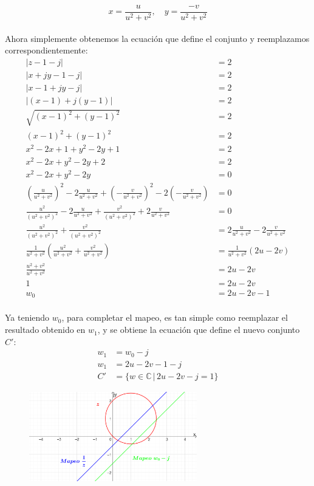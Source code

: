 \documentclass[12pt,a4paper]{report}
\begin{document}
$$ x = \frac{u}{u^2 + v^2}, \quad y = \frac{-v}{u^2 + v^2} $$\\[6pt]
Ahora simplemente obtenemos la ecuación que define el conjunto y reemplazamos correspondientemente:\\
\begin{align*}
|z-1-j| &= 2 \\[6pt]
|x+jy-1-j|  &= 2 \\[6pt]
|x-1+jy-j| &= 2 \\[6pt]
|(x-1)+j(y-1)| &= 2 \\[6pt]
\sqrt{(x-1)^2 + (y-1)^2} &= 2 \\[6pt]
(x-1)^2 + (y-1)^2 &= 2 \\[6pt]
x^2 - 2x + 1 + y^2 - 2y + 1 &= 2 \\[6pt]
x^2 - 2x + y^2 - 2y + 2 &= 2 \\[6pt]
x^2 - 2x + y^2 - 2y &= 0 \\[6pt]
\left(\frac{u}{u^2+v^2} \right)^2 - 2\frac{u}{u^2+v^2} + \left( -\frac{v}{u^2+v^2} \right)^2-2 \left( -\frac{v}{u^2+v^2} \right) &=0\\[6pt]
\frac{u^2}{(u^2+v^2)^2}-2\frac{u}{u^2+v^2} + \frac{v^2}{(u^2+v^2)^2}+2\frac{v}{u^2+v^2}&=0\\[6pt]
\frac{u^2}{(u^2+v^2)^2}+\frac{v^2}{(u^2+v^2)^2}&=2\frac{u}{u^2+v^2} - 2 \frac{v}{u^2+v^2}\\[6pt]
\frac{1}{u^2+v^2} \left( \frac{u^2}{u^2+v^2} + \frac{v^2}{u^2+v^2} \right) &= \frac{1}{u^2+v^2}(2u-2v)\\[6pt]
\frac{u^2+v^2}{u^2+v^2}&=2u-2v\\[6pt]
1 &= 2u - 2v \\[6pt]
w_0 &= 2u - 2v - 1\\[6pt]
\end{align*}
 
Ya teniendo $w_0$, para completar el mapeo, es tan simple como reemplazar el resultado obtenido en $w_1$, y se obtiene la ecuación que define el nuevo conjunto \( C' \):\\
 
 
\begin{align*}
w_1 &= w_0-j \\[5pt]
w_1 &= 2u-2v-1-j \\[5pt]
C' &= \{w \in \mathbb{C} \, | \, 2u-2v-j=1\}
\end{align*}
 
 
\begin{figure}[htbp] %
    \centering %
    \includegraphics[width=0.65\textwidth]{./Imagenes/foto2Ej3.png} %
\end{figure}
\end{document}
